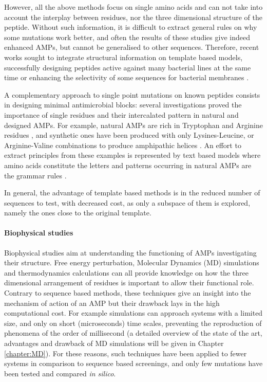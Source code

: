 However, all the above methods focus on single amino acids and can not take into account the interplay between residues, nor the three dimensional structure of the peptide. Without such information, it is difficult to extract general rules on why some mutations work better, and often the results of these studies give indeed enhanced AMPs, but cannot be generalised to other sequences.
%
Therefore, recent works sought to integrate structural information on template based models, successfully designing peptides active against many bacterial lines at the same time \citep{Liu2018} or enhancing the selectivity of some sequences for bacterial membranes \citep{Jiang2011}.

A complementary approach to single point mutations on known peptides consists in designing minimal antimicrobial blocks: several investigations proved the importance of single residues and their intercalated pattern in natural and designed AMPs. For example, natural AMPs are rich in Tryptophan and Arginine residues \citep{Chan2006}, and synthetic ones have been produced with only Lysines-Leucine, or Arginine-Valine combinations to produce amphipathic helices \citep{Deslouches2005}.
%
An effort to extract principles from these examples is represented by text based models where amino acids constitute the letters and patterns occurring in natural AMPs are the grammar rules \citep{Loose2006,Cipcigan2018,Spanig2019}.

In general, the advantage of template based methods is in the reduced number of sequences to test, with decreased cost, as only a subspace of them is explored, namely the ones close to the original template.


\paragraph{Biophysical studies}
Biophysical studies aim at understanding the functioning of AMPs investigating their structure. Free energy perturbation, Molecular Dynamics (MD) simulations and thermodynamics calculations can all provide knowledge on how the three dimensional arrangement of residues is important to allow their functional role.
%
Contrary to sequence based methods, these techniques give an insight into the mechanism of action of an AMP but their drawback lays in the high computational cost. For example simulations can approach systems with a limited size, and only on short (microseconds) time scales, preventing the reproduction of phenomena of the order of millisecond (a detailed overview of the state of the art, advantages and drawback of MD simulations will be given in Chapter \ref{chapter:MD}).
%
For these reasons, such techniques have been applied to fewer systems in comparison to sequence based screenings, and only few mutations have been tested and compared \emph{in silico}.

